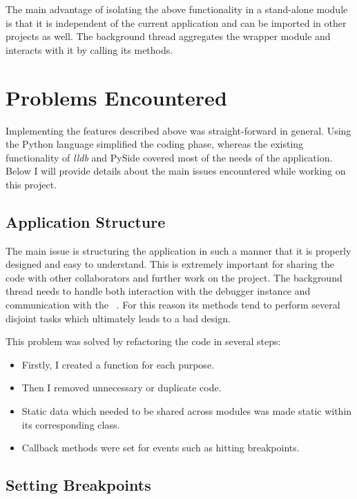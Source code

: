 The main advantage of isolating the above functionality in a stand-alone module is that it is independent of the current application and can be imported in other projects as well. The background thread aggregates the wrapper module and interacts with it by calling its methods.

\section{Problems Encountered}
\label{sec:problems}

Implementing the features described above was straight-forward in general. Using the Python language simplified the coding phase, whereas the existing functionality of \textit{lldb} and PySide covered most of the needs of the application. Below I will provide details about the main issues encountered while working on this project.

\subsection{Application Structure}
\label{sub-sec:structure-prob}

The main issue is structuring the application in such a manner that it is properly designed and easy to understand. This is extremely important for sharing the code with other collaborators and further work on the project. The background thread needs to handle both interaction with the debugger instance and communication with the \gui\ . For this reason its methods tend to perform several disjoint tasks which ultimately leads to a bad design.

This problem was solved by refactoring the code in several steps:
\begin{itemize}
\item Firstly, I created a function for each purpose.
\item Then I removed unnecessary or duplicate code.
\item Static data which needed to be shared across modules was made static within its corresponding class.
\item Callback methods were set for events such as hitting breakpoints.
\end{itemize}

\subsection{Setting Breakpoints}
\label{sub-sec:breakpoints-prob}

